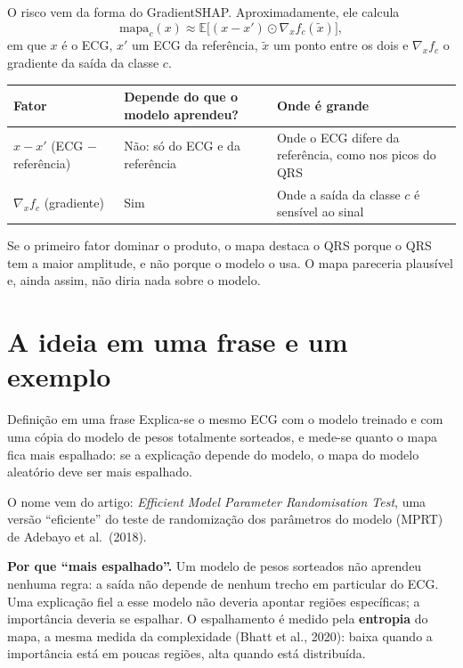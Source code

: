 \documentclass[11pt,a4paper]{article}
\begin{document}
O risco vem da forma do GradientSHAP. Aproximadamente, ele calcula
\[
\text{mapa}_c(x) \approx \mathbb{E}\big[(x - x') \odot \nabla_x f_c(\tilde{x})\big],
\]
em que $x$ é o ECG, $x'$ um ECG da referência, $\tilde{x}$ um ponto entre os dois e $\nabla_x f_c$ o gradiente da saída da classe $c$.
\begin{center}\small
\begin{tabularx}{\linewidth}{lXX}
\toprule
\textbf{Fator} & \textbf{Depende do que o modelo aprendeu?} & \textbf{Onde é grande} \\
\midrule
$x - x'$ (ECG $-$ referência) & Não: só do ECG e da referência & Onde o ECG difere da referência, como nos picos do QRS \\
$\nabla_x f_c$ (gradiente) & Sim & Onde a saída da classe $c$ é sensível ao sinal \\
\bottomrule
\end{tabularx}
\end{center}
Se o primeiro fator dominar o produto, o mapa destaca o QRS porque o QRS tem a maior amplitude, e não porque o modelo o usa. O mapa pareceria plausível e, ainda assim, não diria nada sobre o modelo.

\section{A ideia em uma frase e um exemplo}
\begin{infobox}[note]{Definição em uma frase}
Explica-se o mesmo ECG com o modelo treinado e com uma cópia do modelo de pesos totalmente sorteados, e mede-se quanto o mapa fica mais espalhado: se a explicação depende do modelo, o mapa do modelo aleatório deve ser mais espalhado.
\end{infobox}
O nome vem do artigo: \textit{Efficient Model Parameter Randomisation Test}, uma versão “eficiente” do teste de randomização dos parâmetros do modelo (MPRT) de Adebayo et al.\ (2018).

\textbf{Por que “mais espalhado”.} Um modelo de pesos sorteados não aprendeu nenhuma regra: a saída não depende de nenhum trecho em particular do ECG. Uma explicação fiel a esse modelo não deveria apontar regiões específicas; a importância deveria se espalhar. O espalhamento é medido pela \textbf{entropia} do mapa, a mesma medida da complexidade (Bhatt et al., 2020): baixa quando a importância está em poucas regiões, alta quando está distribuída.
\end{document}
